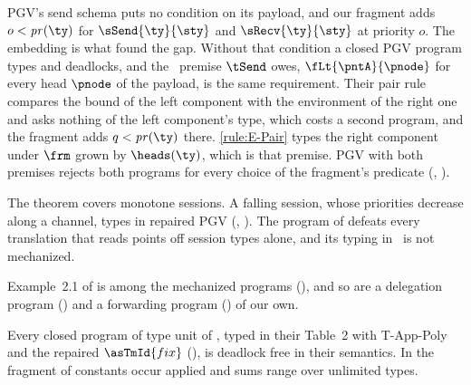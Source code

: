 PGV's send schema puts no condition on its payload, and our fragment
adds $o < \mathit{pr}(\ty)$ for $\sSend{\ty}{\sty}$ and
$\sRecv{\ty}{\sty}$ at priority $o$. The
embedding is what found the gap. Without that condition a closed PGV
program types and deadlocks, and the \OurLang\ premise $\tSend$ owes,
$\fLt{\pntA}{\pnode}$ for every head $\pnode$ of the payload, is the
same requirement. Their pair rule compares the bound of the left
component with the environment of the right one and asks nothing of the
left component's type, which costs a second program, and the fragment
adds $q < \mathit{pr}(\ty)$ there. \ref{rule:E-Pair} types the right
component under $\frm$ grown by $\heads(\ty)$, which is that premise.
PGV with both premises rejects both programs for every choice of the
fragment's predicate (, ).

The theorem covers monotone sessions. A falling session, whose
priorities decrease along a channel, types in repaired PGV
(, ). The program of
 defeats every translation that reads points off
session types alone, and its typing in \OurLang\ is not mechanized.

Example~2.1 of \citet{KokkeD23} is among the mechanized programs
(), and so are a delegation program
() and a forwarding program
() of our own.

\begin{theorem}
\label{thm:pn}
  Every closed program of type unit of \citet{PadovaniN15}, typed in
  their Table~2 with T-App-Poly and the repaired $\asTmId{fix}$
  (), is deadlock free in their semantics. In the
  fragment of  constants occur applied and sums range
  over unlimited types.
\end{theorem}

